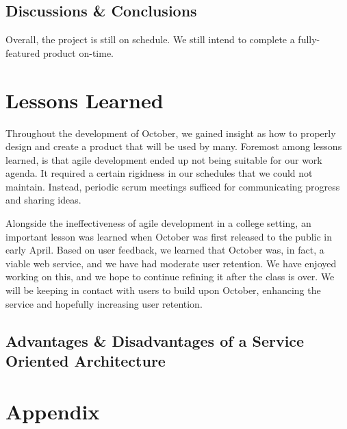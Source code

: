 \documentclass[11pt,letterpaper]{article}
\begin{document}
\subsection{Discussions \& Conclusions}
Overall, the project is still on schedule. We still intend to complete a fully-featured product on-time.

\section{Lessons Learned}

Throughout the development of October, we gained insight as how to properly design and create a product that will be used by many. 
Foremost among lessons learned, is that agile development ended up not being suitable for our work agenda. 
It required a certain rigidness in our schedules that we could not maintain. 
Instead, periodic scrum meetings sufficed for communicating progress and sharing ideas. 

Alongside the ineffectiveness of agile development in a college setting, an important lesson was learned when October was first released to the public in early April. 
Based on user feedback, we learned that October was, in fact, a viable web service, and we have had moderate user retention. 
We have enjoyed working on this, and we hope to continue refining it after the class is over. 
We will be keeping in contact with users to build upon October, enhancing the service and hopefully increasing user retention.

\subsection{Advantages \& Disadvantages of a Service Oriented Architecture}

\section{Appendix}
\end{document}
